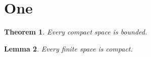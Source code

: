 \documentclass{amsart}
\newtheorem{theorem}{Theorem}[]
\newtheorem{lemma}[theorem]{Lemma}
\begin{document}
\section{One}
\begin{theorem} Every compact space is bounded. \end{theorem}
\begin{lemma} Every finite space is compact. \end{lemma}
\end{document}
